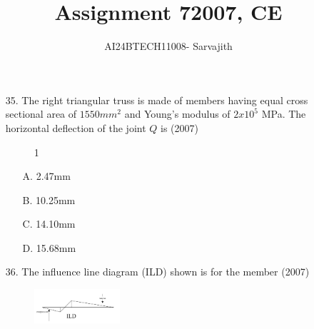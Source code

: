\documentclass[journal]{IEEEtran}
\begin{document}

\vspace{3cm}


\author{AI24BTECH11008- Sarvajith
}
\title{Assignment 7}
 \maketitle
{\let\newpage\relax\maketitle}
\title{2007, CE}
\renewcommand{\thefigure}{\theenumi}
\renewcommand{\thetable}{\theenumi}
\setlength{\intextsep}{10pt} %
\renewcommand{\thetable}{\theenumi}
\begin{enumerate}
  \item[35.]The right triangular truss is made of members having equal cross sectional area of
  $1550 mm^2$ and Young's modulus of $2 x 10^5$ MPa. The horizontal deflection of the
  joint $Q$ is \hfill (2007)
  \begin{figure}[!ht]
    \centering
    \caption{ 1}
    \label{fig:triangle_diagram}
\end{figure}
  \begin{enumerate}
    \item [A.] 2.47mm
    \item [B.] 10.25mm
    \item [C.] 14.10mm
    \item [D.] 15.68mm
  \end{enumerate}
  \item[36.] The influence line diagram (ILD) shown is for the member \hfill (2007)
  \begin{figure}[h!]
    \centering
    \includegraphics[width=0.3\textwidth]{figs/image.png}  %
    
    \label{fig:sample2}
\end{figure}
 \begin{figure}[h!]
 \centering
 
 \label{fig:sample1}
 \end{figure}
    

\end{enumerate}
\end{document}
